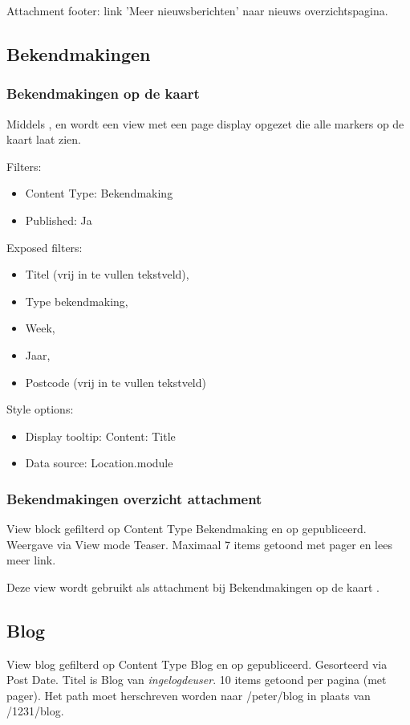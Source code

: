 Attachment footer: link 'Meer nieuwsberichten' naar nieuws overzichtspagina.

\subsection{Bekendmakingen}
\subsubsection{Bekendmakingen op de kaart}\label{bekendmakingen-markers}

Middels ,  en  wordt een view met een page display opgezet die alle markers op de kaart laat zien.

Filters:
\begin{itemize}
\item Content Type: Bekendmaking
\item Published: Ja
\end{itemize}

Exposed filters:
\begin{itemize}
\item Titel (vrij in te vullen tekstveld),
\item Type bekendmaking,
\item Week,
\item Jaar,
\item Postcode (vrij in te vullen tekstveld)
\end{itemize}

Style options:
\begin{itemize}
\item Display tooltip: Content: Title
\item Data source: Location.module
\end{itemize}

\subsubsection{Bekendmakingen overzicht attachment}\label{bekendmakingen-overzicht}

View block gefilterd op Content Type Bekendmaking en op gepubliceerd. Weergave via View mode Teaser. Maximaal 7 items getoond met pager en lees meer link.

Deze view wordt gebruikt als attachment bij Bekendmakingen op de kaart .

\subsection{Blog}
View blog gefilterd op Content Type Blog en op gepubliceerd. Gesorteerd via Post Date. Titel is Blog van \emph{ingelogdeuser}. 10 items getoond per pagina (met pager). Het path moet herschreven worden naar /peter/blog in plaats van /1231/blog.


